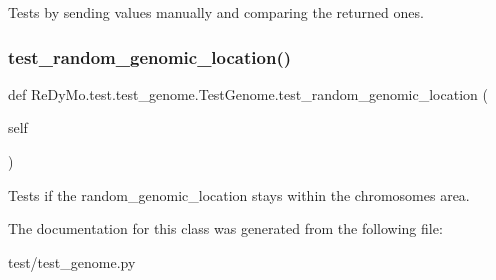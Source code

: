 Tests by sending values manually and comparing the returned ones. 

\mbox{\label{classReDyMo_1_1test_1_1test__genome_1_1TestGenome_a9d1148ac068b11c35cd1d67139b78bfd}} 
\subsubsection{\texorpdfstring{test\+\_\+random\+\_\+genomic\+\_\+location()}{test\_random\_genomic\_location()}}
{\footnotesize\ttfamily def Re\+Dy\+Mo.\+test.\+test\+\_\+genome.\+Test\+Genome.\+test\+\_\+random\+\_\+genomic\+\_\+location (\begin{DoxyParamCaption}\item[{}]{self }\end{DoxyParamCaption})}



Tests if the random\+\_\+genomic\+\_\+location stays within the chromosomes\textquotesingle{} area. 



The documentation for this class was generated from the following file\+:\begin{DoxyCompactItemize}
\item 
test/test\+\_\+genome.\+py\end{DoxyCompactItemize}
